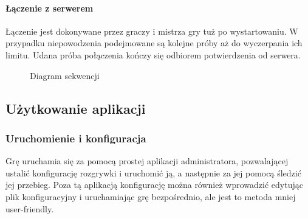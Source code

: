 \documentclass[11pt]{article}
\let\Oldsubsection\subsection
\renewcommand{\subsection}{\FloatBarrier\Oldsubsection}
\let\Oldsubsubsection\subsubsection
\renewcommand{\subsubsection}{\FloatBarrier\Oldsubsubsection}
\begin{document}
\paragraph{Łączenie z serwerem}

Łączenie jest dokonywane przez graczy i mistrza gry tuż po wystartowaniu. W przypadku niepowodzenia podejmowane są kolejne próby aż do wyczerpania ich limitu. Udana próba połączenia kończy się odbiorem potwierdzenia od serwera.

\begin{figure}[!h]
	\centering
	\caption{Diagram sekwencji}
\end{figure}

\subsection{Użytkowanie aplikacji}

\subsubsection{Uruchomienie i konfiguracja}
\par
Grę uruchamia się za pomocą prostej aplikacji administratora, pozwalającej ustalić konfigurację rozgrywki i uruchomić ją, a następnie za jej pomocą śledzić jej przebieg. Poza tą aplikacją konfigurację można również wprowadzić edytując plik konfiguracyjny i uruchamiając grę bezpośrednio, ale jest to metoda mniej user-friendly.
\end{document}
